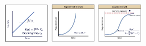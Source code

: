 \includegraphics[width=23mm]{src/Images/doubling_time.png}
\includegraphics[width=23mm]{src/Images/exp_growth.png}
\includegraphics[width=23mm]{src/Images/log_growth.png}
